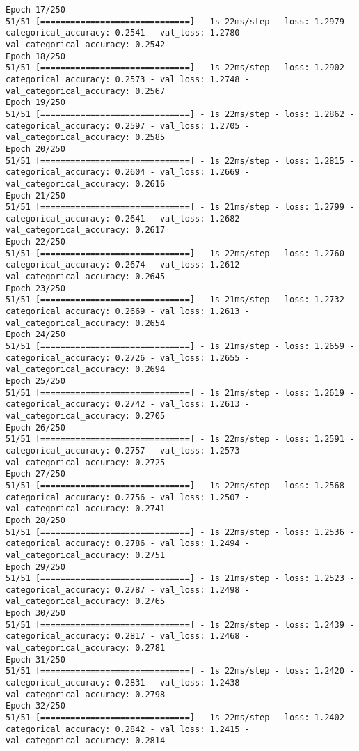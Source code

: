 \begin{lstlisting}
Epoch 17/250
51/51 [==============================] - 1s 22ms/step - loss: 1.2979 - categorical_accuracy: 0.2541 - val_loss: 1.2780 - val_categorical_accuracy: 0.2542
Epoch 18/250
51/51 [==============================] - 1s 22ms/step - loss: 1.2902 - categorical_accuracy: 0.2573 - val_loss: 1.2748 - val_categorical_accuracy: 0.2567
Epoch 19/250
51/51 [==============================] - 1s 22ms/step - loss: 1.2862 - categorical_accuracy: 0.2597 - val_loss: 1.2705 - val_categorical_accuracy: 0.2585
Epoch 20/250
51/51 [==============================] - 1s 22ms/step - loss: 1.2815 - categorical_accuracy: 0.2604 - val_loss: 1.2669 - val_categorical_accuracy: 0.2616
Epoch 21/250
51/51 [==============================] - 1s 21ms/step - loss: 1.2799 - categorical_accuracy: 0.2641 - val_loss: 1.2682 - val_categorical_accuracy: 0.2617
Epoch 22/250
51/51 [==============================] - 1s 22ms/step - loss: 1.2760 - categorical_accuracy: 0.2674 - val_loss: 1.2612 - val_categorical_accuracy: 0.2645
Epoch 23/250
51/51 [==============================] - 1s 21ms/step - loss: 1.2732 - categorical_accuracy: 0.2669 - val_loss: 1.2613 - val_categorical_accuracy: 0.2654
Epoch 24/250
51/51 [==============================] - 1s 21ms/step - loss: 1.2659 - categorical_accuracy: 0.2726 - val_loss: 1.2655 - val_categorical_accuracy: 0.2694
Epoch 25/250
51/51 [==============================] - 1s 21ms/step - loss: 1.2619 - categorical_accuracy: 0.2742 - val_loss: 1.2613 - val_categorical_accuracy: 0.2705
Epoch 26/250
51/51 [==============================] - 1s 22ms/step - loss: 1.2591 - categorical_accuracy: 0.2757 - val_loss: 1.2573 - val_categorical_accuracy: 0.2725
Epoch 27/250
51/51 [==============================] - 1s 22ms/step - loss: 1.2568 - categorical_accuracy: 0.2756 - val_loss: 1.2507 - val_categorical_accuracy: 0.2741
Epoch 28/250
51/51 [==============================] - 1s 22ms/step - loss: 1.2536 - categorical_accuracy: 0.2786 - val_loss: 1.2494 - val_categorical_accuracy: 0.2751
Epoch 29/250
51/51 [==============================] - 1s 21ms/step - loss: 1.2523 - categorical_accuracy: 0.2787 - val_loss: 1.2498 - val_categorical_accuracy: 0.2765
Epoch 30/250
51/51 [==============================] - 1s 22ms/step - loss: 1.2439 - categorical_accuracy: 0.2817 - val_loss: 1.2468 - val_categorical_accuracy: 0.2781
Epoch 31/250
51/51 [==============================] - 1s 22ms/step - loss: 1.2420 - categorical_accuracy: 0.2831 - val_loss: 1.2438 - val_categorical_accuracy: 0.2798
Epoch 32/250
51/51 [==============================] - 1s 22ms/step - loss: 1.2402 - categorical_accuracy: 0.2842 - val_loss: 1.2415 - val_categorical_accuracy: 0.2814

\end{lstlisting}

